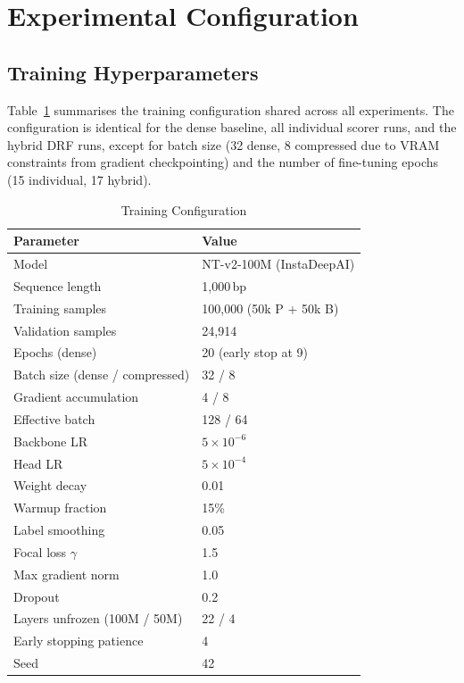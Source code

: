 \documentclass[journal]{IEEEtran}
\begin{document}
\section{Experimental Configuration}
\label{sec:experiment}

\subsection{Training Hyperparameters}

Table~\ref{tab:config} summarises the training configuration
shared across all experiments.
The configuration is identical for the dense baseline, all
individual scorer runs, and the hybrid DRF runs, except for
batch size (32 dense, 8 compressed due to VRAM constraints
from gradient checkpointing) and the number of fine-tuning
epochs (15 individual, 17 hybrid).

\begin{table}[!t]
\centering
\caption{Training Configuration}
\label{tab:config}
\renewcommand{\arraystretch}{1.2}
\begin{tabular}{@{}ll@{}}
\toprule
\textbf{Parameter} & \textbf{Value} \\
\midrule
Model & NT-v2-100M (InstaDeepAI) \\
Sequence length & 1,000\,bp \\
Training samples & 100,000 (50k P + 50k B) \\
Validation samples & 24,914 \\
Epochs (dense) & 20 (early stop at 9) \\
Batch size (dense / compressed) & 32 / 8 \\
Gradient accumulation & 4 / 8 \\
Effective batch & 128 / 64 \\
Backbone LR & $5\times10^{-6}$ \\
Head LR & $5\times10^{-4}$ \\
Weight decay & 0.01 \\
Warmup fraction & 15\% \\
Label smoothing & 0.05 \\
Focal loss $\gamma$ & 1.5 \\
Max gradient norm & 1.0 \\
Dropout & 0.2 \\
Layers unfrozen (100M / 50M) & 22 / 4 \\
Early stopping patience & 4 \\
Seed & 42 \\
\bottomrule
\end{tabular}
\end{table}
\end{document}
